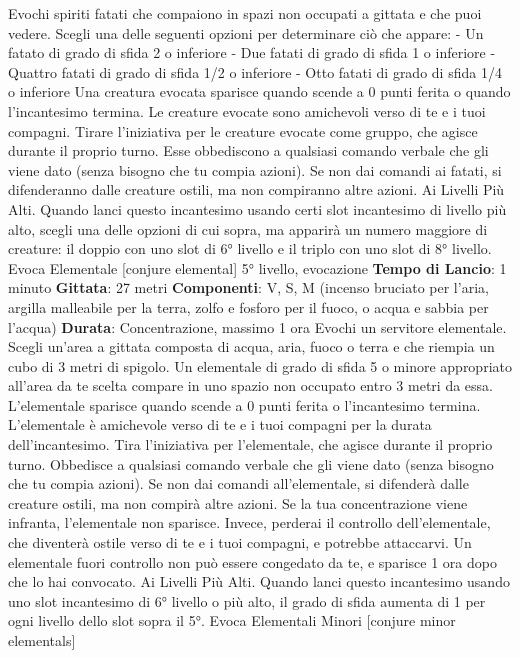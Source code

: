 \begin{multicols}{2}
Evochi spiriti fatati che compaiono in spazi non occupati
a gittata e che puoi vedere. Scegli una delle seguenti
opzioni per determinare ciò che appare:
- Un fatato di grado di sfida 2 o inferiore
- Due fatati di grado di sfida 1 o inferiore
- Quattro fatati di grado di sfida 1/2 o inferiore
- Otto fatati di grado di sfida 1/4 o inferiore
Una creatura evocata sparisce quando scende a 0 punti
ferita o quando l’incantesimo termina.
Le creature evocate sono amichevoli verso di te e i tuoi
compagni. Tirare l’iniziativa per le creature evocate
come gruppo, che agisce durante il proprio turno. Esse
obbediscono a qualsiasi comando verbale che gli viene
dato (senza bisogno che tu compia azioni). Se non dai
comandi ai fatati, si difenderanno dalle creature ostili,
ma non compiranno altre azioni.
Ai Livelli Più Alti. Quando lanci questo incantesimo
usando certi slot incantesimo di livello più alto, scegli
una delle opzioni di cui sopra, ma apparirà un numero
maggiore di creature: il doppio con uno slot di 6° livello
e il triplo con uno slot di 8° livello.
Evoca Elementale
[conjure elemental]
5° livello, evocazione
\textbf{Tempo di Lancio}: 1 minuto
\textbf{Gittata}: 27 metri
\textbf{Componenti}: V, S, M (incenso bruciato per l’aria,
argilla malleabile per la terra, zolfo e fosforo per il
fuoco, o acqua e sabbia per l’acqua)
\textbf{Durata}: Concentrazione, massimo 1 ora
Evochi un servitore elementale. Scegli un’area a gittata
composta di acqua, aria, fuoco o terra e che riempia un
cubo di 3 metri di spigolo. Un elementale di grado di
sfida 5 o minore appropriato all’area da te scelta
compare in uno spazio non occupato entro 3 metri da
essa. L’elementale sparisce quando scende a 0 punti
ferita o l’incantesimo termina.
L’elementale è amichevole verso di te e i tuoi compagni
per la durata dell’incantesimo. Tira l’iniziativa per
l’elementale, che agisce durante il proprio turno.
Obbedisce a qualsiasi comando verbale che gli viene
dato (senza bisogno che tu compia azioni). Se non dai
comandi all’elementale, si difenderà dalle creature ostili,
ma non compirà altre azioni.
Se la tua concentrazione viene infranta, l’elementale
non sparisce. Invece, perderai il controllo
dell’elementale, che diventerà ostile verso di te e i tuoi
compagni, e potrebbe attaccarvi. Un elementale fuori
controllo non può essere congedato da te, e sparisce 1
ora dopo che lo hai convocato.
Ai Livelli Più Alti. Quando lanci questo incantesimo
usando uno slot incantesimo di 6° livello o più alto, il
grado di sfida aumenta di 1 per ogni livello dello slot
sopra il 5°.
Evoca Elementali Minori
[conjure minor elementals]

\end{multicols}
